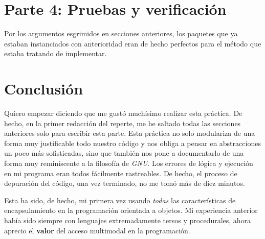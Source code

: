 \documentclass{article}
\begin{document}
	\section*{Parte 4: Pruebas y verificación}
		Por los argumentos esgrimidos en secciones anteriores, los paquetes que ya estaban
		instanciados con anterioridad eran de hecho perfectos para el método que estaba
		tratando de implementar.
	\section*{Conclusión}
		Quiero empezar diciendo que me gustó muchísimo realizar esta práctica. De hecho,
		en la primer redacción del reperte, me he saltado todas las
		secciones anteriores solo para escribir esta parte. Esta práctica no solo modulariza
		de una forma muy justificable todo nuestro código y nos obliga a pensar en
		abstracciones un poco más sofisticadas, sino que también nos pone a documentarlo de
		una forma muy reminiscente a la filosofía de \textit{GNU}. Los errores de lógica y
		ejecución en mi programa eran todos fácilmente rastreables. De hecho, el proceso de
		depuración del código, una vez terminado, no me tomó más de diez minutos.

		Esta ha sido, de hecho, mi primera vez usando \textit{todas} las características de
		 encapsulamiento en la programación orientada a objetos. Mi experiencia anterior
		 había sido siempre con lenguajes extremadamente tersos y procedurales, ahora
		 aprecio el \textbf{valor} del acceso multimodal en la programación.
\end{document}
